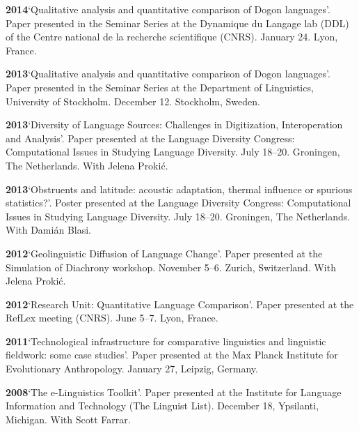 \documentclass[11pt]{article}
\newcommand{\hangpara}{
 \setlength{\parindent}{0in} %
 \hangindent=0.42in %
}
\begin{document}
\vskip 6pt
\hangpara
{\bf 2014}\hspace{1ex}`Qualitative analysis and quantitative comparison of Dogon languages'. Paper presented in the Seminar Series at the Dynamique du Langage lab (DDL) of the Centre national de la recherche scientifique (CNRS). January 24. Lyon, France.

\vskip 6pt
\hangpara
{\bf 2013}\hspace{1ex}`Qualitative analysis and quantitative comparison of Dogon languages'. Paper presented in the Seminar Series at the Department of Linguistics, University of Stockholm. December 12. Stockholm, Sweden.

\vskip 6pt
\hangpara
{\bf 2013}\hspace{1ex}`Diversity of Language Sources: Challenges in Digitization, Interoperation and Analysis'. Paper presented at the Language Diversity Congress: Computational Issues in Studying Language Diversity. July 18--20. Groningen, The Netherlands. With Jelena Proki{\'c}.

\vskip 6pt
\hangpara
{\bf 2013}\hspace{1ex}`Obstruents and latitude: acoustic adaptation, thermal influence or spurious statistics?'. Poster presented at the Language Diversity Congress: Computational Issues in Studying Language Diversity. July 18--20. Groningen, The Netherlands. With Dami{\'a}n Blasi.

\vskip 6pt
\hangpara
{\bf 2012}\hspace{1ex}`Geolinguistic Diffusion of Language Change'. Paper presented at the Simulation of Diachrony workshop. November 5--6. Zurich, Switzerland. With Jelena Proki{\'c}.

\vskip 6pt
\hangpara
{\bf 2012}\hspace{1ex}`Research Unit: Quantitative Language Comparison'. Paper presented at the RefLex meeting (CNRS). June 5--7. Lyon, France. 

\vskip 6pt
\hangpara
{\bf 2011}\hspace{1ex}`Technological infrastructure for comparative linguistics and linguistic fieldwork: some case studies'. Paper presented at the Max Planck Institute for Evolutionary Anthropology. January 27, Leipzig, Germany. 

\vskip 6pt
\hangpara
{\bf 2008}\hspace{1ex}`The e-Linguistics Toolkit'. Paper presented at the Institute for Language Information and Technology (The Linguist List). December 18, Ypsilanti, Michigan. With Scott Farrar.
\end{document}
